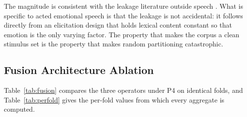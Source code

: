 \documentclass[journal,onecolumn,11pt,draftclsnofoot]{IEEEtran}   %
\begin{document}
The magnitude is consistent with the leakage literature outside speech
\cite{rosenblatt2024leakage,elangovan2021memorization}. What is specific to
acted emotional speech is that the leakage is not accidental: it follows
directly from an elicitation design that holds lexical content constant so that
emotion is the only varying factor. The property that makes the corpus a clean
stimulus set is the property that makes random partitioning catastrophic.

\subsection{Fusion Architecture Ablation}
\label{sec:fusion}
Table~\ref{tab:fusion} compares the three operators under P4 on identical folds,
and Table~\ref{tab:perfold} gives the per-fold values from which every
aggregate is computed.

\begin{table}[!t]
\centering\small
\setlength{\tabcolsep}{3pt}
\caption{Fusion-operator ablation under speaker-independent five-fold
cross-validation (P4), identical folds, features, encoder depth,
hyperparameters and head capacity. Mean $\pm$ SD across folds; 95\% CI of the
mean in brackets. No value is bolded: the top two operators are statistically
indistinguishable (Table~\ref{tab:fusion-stats}).}
\label{tab:fusion}
\end{table}
\end{document}
